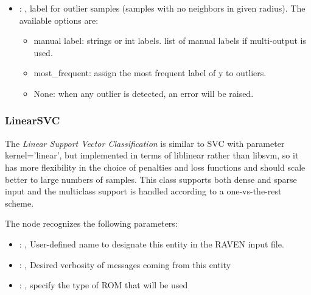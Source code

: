 \begin{itemize}
    \item {}: , 
      label for outlier samples (samples with no neighbors in given radius).
      The available options are:                                                  \begin{itemize}
      \item manual label: strings or int labels. list of manual labels if multi-output is used.
      \item most\_frequent: assign the most frequent label of y to outliers.
      \item None: when any outlier is detected, an error will be raised.
      \end{itemize}
  \end{itemize}


\subsubsection{LinearSVC}
  The  \textit{Linear Support Vector Classification} is
  similar to SVC with parameter kernel=’linear’, but implemented in terms of liblinear rather than
  libsvm,                             so it has more flexibility in the choice of penalties and loss
  functions and should scale better to large numbers of samples.                             This
  class supports both dense and sparse input and the multiclass support is handled according to a
  one-vs-the-rest scheme.                             

  The  node recognizes the following parameters:
    \begin{itemize}
      \item {}: , 
        User-defined name to designate this entity in the RAVEN input file.
      \item {}: , 
        Desired verbosity of messages coming from this entity
      \item {}: , 
        specify the type of ROM that will be used
  \end{itemize}


